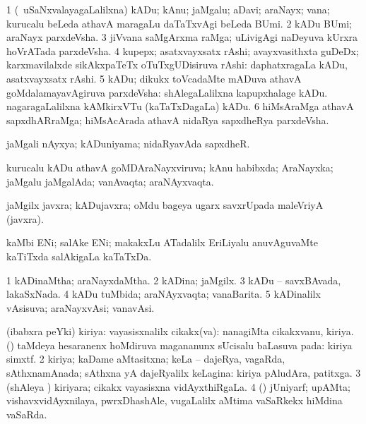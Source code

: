 \bentry
{}
\gl{\nA}
\bmng
\bnum
\num{1} (\kanmu\ uSaNxvalayagaLalilxna) kADu; kAnu; jaMgalu; aDavi; araNayx; vana; kurucalu beLeda athavA maragaLu daTaTxvAgi beLeda BUmi. 
\num{2} kADu BUmi; araNayx parxdeVsha. 
\num{3} jiVvana saMgArxma raMga; uLivigAgi naDeyuva kUrxra hoVrATada parxdeVsha. 
\num{4} kupepx; asatxvayxsatx rAshi; avayxvasithxta guDeDx; karxmavilalxde sikAkxpaTeTx oTuTxgUDisiruva rAshi:  daphatxragaLa kADu, asatxvayxsatx rAshi. 
\num{5} kADu; dikukx toVcadaMte mADuva athavA goMdalamayavAgiruva parxdeVsha:  shAlegaLalilxna kapupxhalage kADu.  nagaragaLalilxna kAMkirxVTu (kaTaTxDagaLa) kADu. 
\num{6} hiMsAraMga athavA sapxdhARraMga; hiMsAcArada athavA nidaRya sapxdheRya parxdeVsha. 
\enum
\emng

\noindent
\gl{\pagu}
\bmng
{} jaMgali nAyxya; kADuniyama; nidaRyavAda sapxdheR. 
\emng
\eentry

\bentry
{}
\gl{\gu}
\bmng
kurucalu kADu athavA goMDAraNayxviruva; kAnu habibxda; AraNayxka; jaMgalu jaMgalAda; vanAvaqta; araNAyxvaqta. 
\emng
\eentry

\bentry
{}
\gl{\nA}
\bmng
jaMgilx javxra; kADujavxra; oMdu bageya ugarx savxrUpada maleVriyA (javxra). 
\emng
\eentry

\bentry
{}
\gl{\nA}
\bmng
kaMbi ENi; salAke ENi; makakxLu ATadalilx EriLiyalu anuvAguvaMte kaTiTxda salAkigaLa kaTaTxDa.  
\emng
\eentry

\bentry
{} 
\gl{\gu}
\bmng
\bnum
\num{1} kADinaMtha; araNayxdaMtha. 
\num{2} kADina; jaMgilx. 
\num{3} kADu -- savxBAvada, lakaSxNada. 
\num{4} kADu tuMbida; araNAyxvaqta; vanaBarita. 
\num{5} kADinalilx vAsisuva; araNayxvAsi; vanavAsi. 
\enum
\emng
\eentry

\bentry
{}
\gl{\gu}
\bmng
\bnum
{} (ibabxra peYki) kiriya: 
\banum
{} vayasisxnalilx cikakx(va):  nanagiMta cikakxvanu, kiriya. 
 (\kanmu) taMdeya hesaranenx hoMdiruva magananunx sUcisalu baLasuva pada:  kiriya simxtf. 
\eanum
\numie
\num{2} kiriya; kaDame aMtasitxna; keLa -- dajeRya, vagaRda, sAthxnamAnada; sAthxna yA dajeRyalilx keLagina:   kiriya pAludAra, patitxga. 
\num{3} (shAleya \vi) kiriyara; cikakx vayasisxna vidAyxthiRgaLa. 
\num{4} (\ame) jUniyarf; upAMta; vishavxvidAyxnilaya, pwrxDhashAle, \mo vugaLalilx aMtima vaSaRkekx hiMdina vaSaRda. 
\enum
\emng
\eentry

